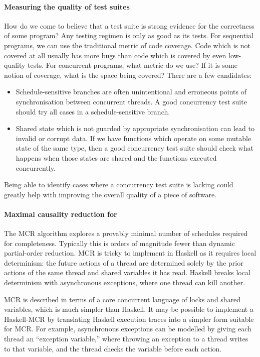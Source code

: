 \paragraph{Measuring the quality of test suites}
How do we come to believe that a test suite is strong evidence for the
correctness of some program?  Any testing regimen is only as good as
its tests.  For sequential programs, we can use the traditional metric
of code coverage.  Code which is not covered at all usually has more
bugs than code which is covered by even low-quality
tests\cite{ahmed2016}.  For concurrent programs, what metric do we
use?  If it is some notion of coverage, what is the space being
covered?  There are a few candidates:

\begin{itemize}
\item Schedule-sensitive branches are often unintentional and
  erroneous points of synchronisation between concurrent
  threads\cite{huang2015ssb}.  A good concurrency test suite should
  try all cases in a schedule-sensitive branch.

\item Shared state which is not guarded by appropriate synchronisation
  can lead to invalid or corrupt data.  If we have functions which
  operate on some mutable state of the same type, then a good
  concurrency test suite should check what happens when those states
  are shared and the functions executed concurrently.
\end{itemize}

Being able to identify cases where a concurrency test suite is lacking
could greatly help with improving the overall quality of a piece of
software.

\paragraph{Maximal causality reduction for \dejafu{}}
The MCR algorithm\cite{huang2015} explores a provably minimal number
of schedules required for completeness.  Typically this is orders of
magnitude fewer than dynamic partial-order reduction.  MCR is tricky
to implement in Haskell as it requires local determinism: the future
actions of a thread are determined solely by the prior actions of the
same thread and shared variables it has read.  Haskell breaks local
determinism with asynchronous exceptions, where one thread can kill
another.

MCR is described in terms of a core concurrent language of locks and
shared variables, which is much simpler than Haskell.  It may be
possible to implement a Haskell-MCR by translating Haskell execution
traces into a simpler form suitable for MCR\@.  For example,
asynchronous exceptions can be modelled by giving each thread an
``exception variable,'' where throwing an exception to a thread writes
to that variable, and the thread checks the variable before each
action.

